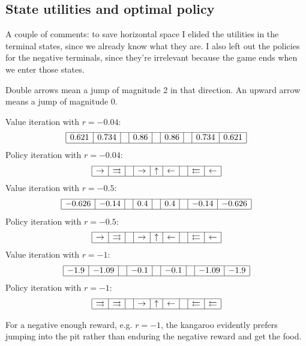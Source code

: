 \documentclass[letterpaper, 10pt]{article}
\begin{document}
\begin{multicols*}{2}
\subsection{State utilities and optimal policy}
A couple of comments: to save horizontal space I elided the utilities in the terminal states, since we already know what they are.
I also left out the policies for the negative terminals, since they're irrelevant because the game ends when we enter those states.

Double arrows mean a jump of magnitude 2 in that direction.
An upward arrow means a jump of magnitude 0.

Value iteration with $r = -0.04$:
\[
\begin{array}{|c|c|c|c|c|c|c|c|c|}
	\hline
	0.621 & 0.734 & & 0.86 & & 0.86 & & 0.734 & 0.621 \\
	\hline
\end{array}
\]
Policy iteration with $r = -0.04$:
\[
\begin{array}{|c|c|c|c|c|c|c|c|c|}
	\hline
	\rightarrow & \rightrightarrows & & \rightarrow & \uparrow & \leftarrow & & \leftleftarrows & \leftarrow \\
	\hline
\end{array}
\]
Value iteration with $r = -0.5$:
\[
\begin{array}{|c|c|c|c|c|c|c|c|c|}
	\hline
	-0.626 & -0.14 & & 0.4 & & 0.4 & & -0.14 & -0.626 \\
	\hline
\end{array}
\]
Policy iteration with $r = -0.5$:
\[
\begin{array}{|c|c|c|c|c|c|c|c|c|}
	\hline
	\rightarrow & \rightrightarrows & & \rightarrow & \uparrow & \leftarrow & & \leftleftarrows & \leftarrow \\
	\hline
\end{array}
\]
Value iteration with $r = -1$:
\[
\begin{array}{|c|c|c|c|c|c|c|c|c|}
	\hline
	-1.9 & -1.09 & & -0.1 & & -0.1 & & -1.09 & -1.9 \\
	\hline
\end{array}
\]
Policy iteration with $r = -1$:
\[
\begin{array}{|c|c|c|c|c|c|c|c|c|}
	\hline
	\rightrightarrows & \rightrightarrows & & \rightarrow & \uparrow & \leftarrow & & \leftleftarrows & \leftleftarrows \\
	\hline
\end{array}
\]

For a negative enough reward, e.g. $r = -1$, the kangaroo evidently prefers jumping into the pit rather than enduring the negative reward and get the food.

\end{multicols*}
\end{document}

